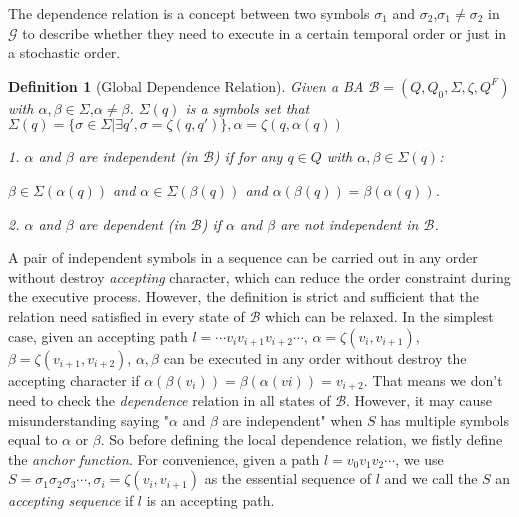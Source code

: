 \documentclass[journal]{IEEEtran}
\newtheorem{definition}{Definition}
\begin{document}
The dependence relation is a concept between  two symbols $\sigma_1$ and $\sigma_2$,$\sigma_1\ne\sigma_2$ in $\mathcal{G}$ to describe whether they need to execute in a certain temporal order or just in a stochastic order.
\begin{definition}[Global Dependence Relation]
	Given a BA $\mathcal{B}=(Q,Q_0,\Sigma,\zeta,Q^{F})$ with $\alpha,\beta\in\Sigma$,$\alpha\ne\beta$. $\Sigma(q)$ is a symbols set that $\Sigma(q)=\{\sigma\in\Sigma|\exists{q'},\sigma=\zeta(q,q')\},\alpha=\zeta(q,\alpha(q))$ 
	
	1. $\alpha$ and $\beta$ are \emph{independent} (in $\mathcal{B}$) if for any $q\in Q$ with $\alpha,\beta\in\Sigma(q)$:
	
	$\beta\in\Sigma(\alpha(q))$ and  $\alpha\in\Sigma(\beta(q))$ and $\alpha(\beta(q))=\beta(\alpha(q))$.
	
	2. $\alpha$ and $\beta$ are \emph{dependent} (in $\mathcal{B}$) if $\alpha$ and $\beta$ are not \emph{independent} in $\mathcal{B}$.
\end{definition}%

A pair of independent symbols in a sequence can be carried out in any order without destroy \emph{accepting} character, which can reduce the order constraint during the executive process. However, the definition is strict and sufficient that the relation need satisfied in every state of $\mathcal{B}$ which can be relaxed.
In the simplest case, given an accepting path $l=\cdots v_iv_{i+1}v_{i+2}\cdots$, $\alpha=\zeta(v_i,v_{i+1})$,$\beta=\zeta(v_{i+1},v_{i+2})$, $\alpha,\beta$ can be executed in any order without destroy the accepting character if $\alpha(\beta(v_i))=\beta(\alpha(vi))=v_{i+2}$. That means we don't need to check the \emph{dependence} relation in all states of $\mathcal{B}$. However, it may cause misunderstanding saying "$\alpha$ and $\beta$ are independent" when $S$ has multiple symbols equal to $\alpha$ or $\beta$. So before defining the local dependence relation, we fistly define the \emph{anchor function}.
 For convenience, given a path $l=v_0v_1v_2\cdots$, we use $S=\sigma_1\sigma_2\sigma_3\cdots,\sigma_i=\zeta(v_i,v_{i+1})$ as the essential sequence of $l$ and we call the $S$ an \emph{accepting sequence} if $l$ is an accepting path.
\end{document}
